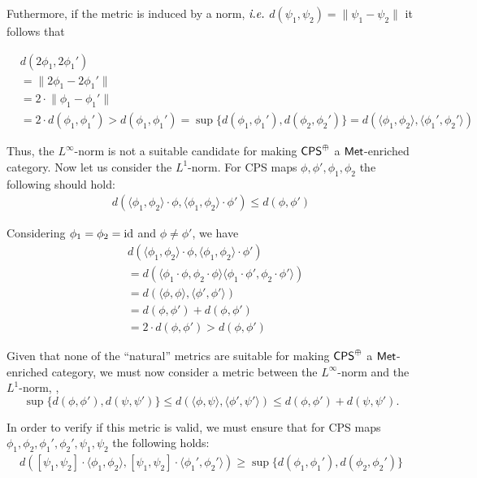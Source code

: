\documentclass[10pt,a4paper]{amsart}
\theoremstyle{definition}
\theoremstyle{definition}
\theoremstyle{definition}
\theoremstyle{definition}
\theoremstyle{definition}
\theoremstyle{definition}
\begin{document}
Futhermore, if the metric is induced by a norm, $\emph{i.e.}$ $d (\psi_1, \psi_2) = \lVert \psi_1 - \psi_2\lVert$ it follows that

\begin{align*}
  & d(2 \phi_1, 2 \phi_1') \\
  & = \lVert 2 \phi_1 - 2 \phi_1' \lVert \\
  & = 2 \cdot \lVert \phi_1 - \phi_1' \lVert \\
  & = 2 \cdot  d(\phi_1, \phi_1') > d(\phi_1, \phi_1') = \sup \{d(\phi_1, \phi_1'), d(\phi_2, \phi_2')\} = d(\langle \phi_1, \phi_2 \rangle, \langle \phi_1', \phi_2' \rangle )
\end{align*}

Thus, the $L^{\infty}$-norm is not a suitable candidate for making $\mathsf{CPS}^{\oplus}$ a $\mathsf{Met}$-enriched category. Now let us consider the $L^{1}$-norm. For CPS maps $ \phi, \phi', \phi_1, \phi_2$ the following should hold:
\begin{align*}
  d( \langle \phi_1, \phi_2 \rangle \cdot \phi, \langle \phi_1, \phi_2 \rangle \cdot \phi' ) \leq d(\phi, \phi')
\end{align*}

Considering $\phi_1=\phi_2 = \mathrm{id}$ and $\phi \neq \phi'$, we have
\begin{align*}
  & d( \langle \phi_1, \phi_2 \rangle \cdot \phi, \langle \phi_1, \phi_2 \rangle \cdot \phi' )  \\
  & = d(  \langle \phi_1 \cdot \phi, \phi_2 \cdot \phi \rangle \langle \phi_1 \cdot \phi', \phi_2 \cdot \phi' \rangle ) \\
  & = d(  \langle  \phi, \phi \rangle, \langle  \phi',  \phi' \rangle  )  \\
  & = d(  \phi,  \phi'  ) +  d(  \phi,  \phi'  ) \\
  & = 2 \cdot d(  \phi,  \phi'  ) > d(  \phi,  \phi'  )
\end{align*}

Given that none of the ``natural'' metrics are suitable for making $\mathsf{CPS}^{\oplus}$ a $\mathsf{Met}$-enriched category, we must now consider a metric between the $L^{\infty}$-norm and the $L^{1}$-norm, \ie, $$\sup \{ d(\phi, \phi' ), d(\psi, \psi') \} \leq d(\langle \phi, \psi \rangle, \langle \phi', \psi' \rangle ) \leq d(\phi, \phi' ) +  d(\psi, \psi').$$

In order to verify if this metric is valid,  we must ensure that for CPS maps $\phi_1, \phi_2,  \phi_1', \phi_2', \psi_1, \psi_2$ the following holds:
\begin{align*}
  d([\psi_1, \psi_2] \cdot \langle \phi_1, \phi_2 \rangle, [\psi_1, \psi_2] \cdot \langle \phi_1', \phi_2' \rangle ) \geq \sup \{ d(\phi_1, \phi_1' ), d(\phi_2, \phi_2') \}
\end{align*}
\end{document}
